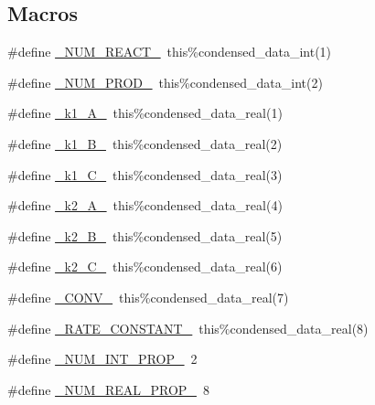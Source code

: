 \subsection*{Macros}
\begin{DoxyCompactItemize}
\item 
\#define \mbox{\hyperlink{rxn___c_m_a_q___h2_o2_8_f90_aee1fee52189b85b8a55162815b7eb2ab}{\+\_\+\+N\+U\+M\+\_\+\+R\+E\+A\+C\+T\+\_\+}}~this\%condensed\+\_\+data\+\_\+int(1)
\item 
\#define \mbox{\hyperlink{rxn___c_m_a_q___h2_o2_8_f90_a0ab2d7e00e334b5c52335f26ef6025e8}{\+\_\+\+N\+U\+M\+\_\+\+P\+R\+O\+D\+\_\+}}~this\%condensed\+\_\+data\+\_\+int(2)
\item 
\#define \mbox{\hyperlink{rxn___c_m_a_q___h2_o2_8_f90_ae0b6f4a5f7f7c62d9e6f9f0ab911fe64}{\+\_\+k1\+\_\+\+A\+\_\+}}~this\%condensed\+\_\+data\+\_\+real(1)
\item 
\#define \mbox{\hyperlink{rxn___c_m_a_q___h2_o2_8_f90_a6860788a467b6af265175423c1dcbc28}{\+\_\+k1\+\_\+\+B\+\_\+}}~this\%condensed\+\_\+data\+\_\+real(2)
\item 
\#define \mbox{\hyperlink{rxn___c_m_a_q___h2_o2_8_f90_a2f2857cfad45a438205857f86eeffa6a}{\+\_\+k1\+\_\+\+C\+\_\+}}~this\%condensed\+\_\+data\+\_\+real(3)
\item 
\#define \mbox{\hyperlink{rxn___c_m_a_q___h2_o2_8_f90_aa61819ddc6aaa6275030c0ada2664978}{\+\_\+k2\+\_\+\+A\+\_\+}}~this\%condensed\+\_\+data\+\_\+real(4)
\item 
\#define \mbox{\hyperlink{rxn___c_m_a_q___h2_o2_8_f90_a9eb83934d412685a55de48b3bdb7684b}{\+\_\+k2\+\_\+\+B\+\_\+}}~this\%condensed\+\_\+data\+\_\+real(5)
\item 
\#define \mbox{\hyperlink{rxn___c_m_a_q___h2_o2_8_f90_a3ae107fbcbf31082a1331399405d37cc}{\+\_\+k2\+\_\+\+C\+\_\+}}~this\%condensed\+\_\+data\+\_\+real(6)
\item 
\#define \mbox{\hyperlink{rxn___c_m_a_q___h2_o2_8_f90_a8d22506f8671e195690022c44d319caf}{\+\_\+\+C\+O\+N\+V\+\_\+}}~this\%condensed\+\_\+data\+\_\+real(7)
\item 
\#define \mbox{\hyperlink{rxn___c_m_a_q___h2_o2_8_f90_a90fa57a01e99ca76df9ef2ac521667ec}{\+\_\+\+R\+A\+T\+E\+\_\+\+C\+O\+N\+S\+T\+A\+N\+T\+\_\+}}~this\%condensed\+\_\+data\+\_\+real(8)
\item 
\#define \mbox{\hyperlink{rxn___c_m_a_q___h2_o2_8_f90_a54f7194dc6a244f7eb7a78f88b3362ba}{\+\_\+\+N\+U\+M\+\_\+\+I\+N\+T\+\_\+\+P\+R\+O\+P\+\_\+}}~2
\item 
\#define \mbox{\hyperlink{rxn___c_m_a_q___h2_o2_8_f90_a242fac7fe42c0d62936c65735dc023a6}{\+\_\+\+N\+U\+M\+\_\+\+R\+E\+A\+L\+\_\+\+P\+R\+O\+P\+\_\+}}~8

\end{DoxyCompactItemize}
